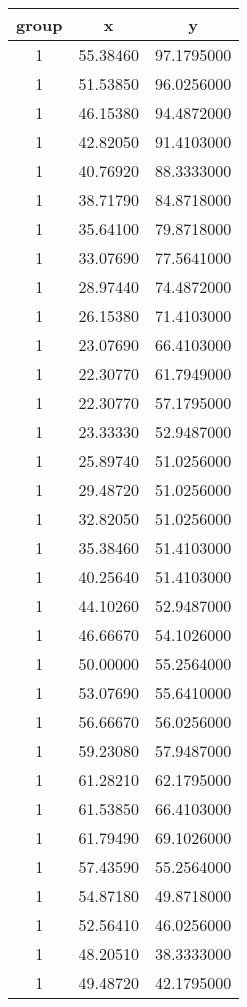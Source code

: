 \documentclass[
]{book}
\begin{document}
\begin{tabular}{c|c|c}
\hline
group & x & y\\
\hline
1 & 55.38460 & 97.1795000\\
\hline
1 & 51.53850 & 96.0256000\\
\hline
1 & 46.15380 & 94.4872000\\
\hline
1 & 42.82050 & 91.4103000\\
\hline
1 & 40.76920 & 88.3333000\\
\hline
1 & 38.71790 & 84.8718000\\
\hline
1 & 35.64100 & 79.8718000\\
\hline
1 & 33.07690 & 77.5641000\\
\hline
1 & 28.97440 & 74.4872000\\
\hline
1 & 26.15380 & 71.4103000\\
\hline
1 & 23.07690 & 66.4103000\\
\hline
1 & 22.30770 & 61.7949000\\
\hline
1 & 22.30770 & 57.1795000\\
\hline
1 & 23.33330 & 52.9487000\\
\hline
1 & 25.89740 & 51.0256000\\
\hline
1 & 29.48720 & 51.0256000\\
\hline
1 & 32.82050 & 51.0256000\\
\hline
1 & 35.38460 & 51.4103000\\
\hline
1 & 40.25640 & 51.4103000\\
\hline
1 & 44.10260 & 52.9487000\\
\hline
1 & 46.66670 & 54.1026000\\
\hline
1 & 50.00000 & 55.2564000\\
\hline
1 & 53.07690 & 55.6410000\\
\hline
1 & 56.66670 & 56.0256000\\
\hline
1 & 59.23080 & 57.9487000\\
\hline
1 & 61.28210 & 62.1795000\\
\hline
1 & 61.53850 & 66.4103000\\
\hline
1 & 61.79490 & 69.1026000\\
\hline
1 & 57.43590 & 55.2564000\\
\hline
1 & 54.87180 & 49.8718000\\
\hline
1 & 52.56410 & 46.0256000\\
\hline
1 & 48.20510 & 38.3333000\\
\hline
1 & 49.48720 & 42.1795000\\

\end{tabular}
\end{document}

